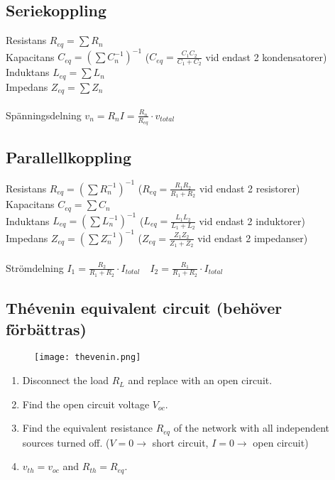 \subsection{Seriekoppling}

Resistans $ R_{eq} = \sum R_n $
\\
Kapacitans  $ C_ {eq} = (\sum C_n ^{-1})^{-1} $ \tab (\( C_{eq} = \frac{C_1C_2}{C_1+C_2} \) vid endast 2 kondensatorer)
\\
Induktans $ L_{eq} = \sum L_n $
\\
Impedans \( Z_{eq} = \sum Z_n \)
\\ \\
Spänningsdelning \tab $ v_{n} = R_nI = \frac{R_n}{R_{eq}} \cdot v_{total} $

\subsection{Parallellkoppling}

Resistans $ R_{eq} = (\sum R_n^{-1})^{-1} $ \tab ($ R_{eq} = \frac{R_1R_2}{R_1 + R_2} $ vid endast 2 resistorer)
\\
Kapacitans $ C_{eq} = \sum C_n $
\\
Induktans $ L_{eq} = (\sum L_n^{-1})^{-1} $ \tab (\(L_{eq} = \frac{L_1L_2}{L_1+L_2}\) vid endast 2 induktorer)
\\
Impedans \( Z_{eq} = (\sum Z_n^{-1})^{-1} \) \tab (\( Z_{eq} = \frac{Z_1Z_2}{Z_1 + Z_2} \) vid endast 2 impedanser)
\\ \\
Strömdelning \tab $ I_1 = \frac{R_2}{R_1+R_2} \cdot I_{total} \quad I_2 = \frac{R_1}{R_1+R_2} \cdot I_{total} $

\subsection{Thévenin equivalent circuit (behöver förbättras)}

\begin{figure}[H]
    \centering
        \texttt{[image: thevenin.png]}
    \label{fig:thevenin}
\end{figure}

\begin{enumerate}
    \item Disconnect the load \(R_L\) and replace with an open circuit.
    \item Find the open circuit voltage \(V_{oc}\).
    \item Find the equivalent resistance \(R_{eq}\) of the network with all independent sources turned off. (\(V=0 \rightarrow \) short circuit, \( I=0 \rightarrow \) open circuit)
    \item \(v_{th} = v_{oc}\) and \(R_{th} = R_{eq}\).
\end{enumerate}

